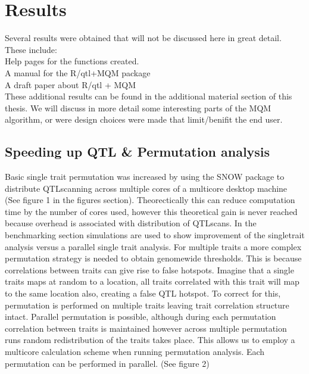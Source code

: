 \newpage
\section{Results}
Several results were obtained that will not be discussed here in great detail. These include:\\
Help pages for the functions created.\\
A manual for the R/qtl+MQM package\\
A draft paper about R/qtl + MQM\\
These additional results can be found in the additional material section of this thesis. We will discuss in more detail some interesting parts of the MQM algorithm, or were design choices were made that limit/benifit the end user.
\subsection{Speeding up QTL \& Permutation analysis}
Basic single trait permutation was increased by using the SNOW package to distribute QTLscanning across multiple cores of a multicore desktop machine (See figure 1 in the figures section). 
Theorectically this can reduce computation time by the number of cores used, however this theoretical gain is never reached because overhead is associated with distribution of QTLscans. In the benchmarking section simulations are used to show improvement of the singletrait analysis versus a parallel single trait analysis. For multiple traits a more complex permutation strategy is needed to obtain genomewide thresholds. This is because correlations between traits can give rise to false hotspots. Imagine that a single traits maps at random to a location, all traits correlated with this trait will map to the same location also, creating a false QTL hotspot. To correct for this, permutation is performed on multiple traits leaving trait correlation structure intact. Parallel permutation is possible, although during each permutation correlation between traits is maintained however across multiple permutation runs random redistribution of the traits takes place. This allows us to employ a multicore calculation scheme when running permutation analysis. Each permutation can be performed in parallel.  (See figure 2)
